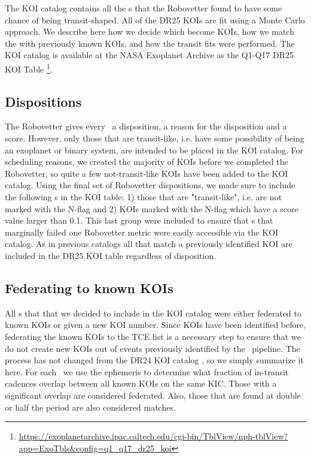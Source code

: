 The KOI catalog contains all the \opstce s that the Robovetter found to have some chance of being transit-shaped. All of the DR25 KOIs are fit using a Monte Carlo approach. We describe here how we decide which  become KOIs, how we match the  with previously known KOIs, and how the transit fits were performed. The KOI catalog is available at the NASA Exoplanet Archive as the Q1-Q17 DR25 KOI Table \footnote{\url{https://exoplanetarchive.ipac.caltech.edu/cgi-bin/TblView/nph-tblView?app=ExoTbls\&config=q1\_q17\_dr25\_koi}}.
\label{koisec}

\subsection{Dispositions}
The Robovetter gives every \opstce\ a disposition, a reason for the disposition and a score.  However, only those that are transit-like, i.e. have some possibility of being an exoplanet or binary system, are intended to be placed in the KOI catalog. For scheduling reasons, we created the majority of KOIs before we completed the Robovetter, so quite a few not-transit-like KOIs have been added to the KOI catalog. Using the final set of Robovetter dispositions, we made sure to include the following \opstce s in the KOI table: 1) those that are "transit-like", i.e. are not marked with the N-flag and 2) KOIs marked with the N-flag which have a score value larger than 0.1.  This last group were included to ensure that \opstce s that marginally failed one Robovetter metric were easily accessible via the KOI catalog. As in previous catalogs all  that match a previously identified KOI are included in the DR25 KOI table regardless of disposition.


\subsection{Federating to known KOIs}
All \opstce s that that we decided to include in the KOI catalog were either federated to known KOIs or given a new KOI number. Since KOIs have been identified before, federating the known KOIs to the TCE list is a necessary step to ensure that we do not create new KOIs out of events previously identified by the \Kepler\ pipeline.  The process has not changed from the  DR24 KOI catalog \citep{Coughlin2016}, so we simply summarize it here.  For each \opstce\ we use the ephemeris to determine what fraction of in-transit cadences overlap between all known KOIs on the same KIC.  Those with a significant overlap are considered federated.  Also, those that are found at double or half the period are also considered matches.  

